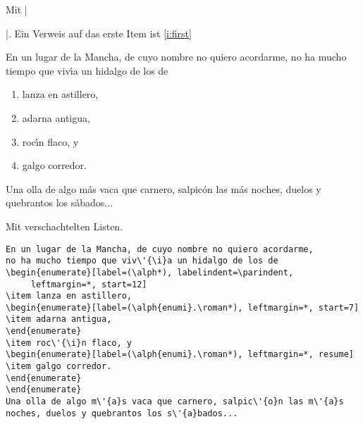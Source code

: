 \documentclass[a4paper,ngerman]{ltxguide}
\newcommand\0{\unskip\enspace\fbox{\fontsize{4}{4}\selectfont NEU 3.0}}
\newcommand\3{\unskip\enspace\fbox{\fontsize{4}{4}\selectfont NEW 3.0}}
\begin{document}
\begin{enumerate}[leftmargin=*]
\begin{enumerate}[leftmargin=\parindent]
\begin{enumerate}[labelindent=\parindent,|\allowbreak
| leftmargin=*,|\allowbreak| label=\Roman*.,|\allowbreak
| widest=IV,|\allowbreak| align=left]
\newsample

Mit |\begin{enumerate}[label=\fbox{\arabic*}]|. Ein Verweis auf das erste Item ist \ref{i:first}

\samplesep

En un lugar de la Mancha, de cuyo nombre no quiero acordarme,
no ha mucho tiempo que viv\'{\i}a un hidalgo de los de
\begin{enumerate}[label=\fbox{\arabic*}]
\item \label{i:first}lanza en astillero,
\item adarna antigua,
\item roc\'{\i}n flaco, y
\item galgo corredor.
\end{enumerate}
Una olla de algo m\'{a}s vaca que carnero, salpic\'{o}n las m\'{a}s
noches, duelos y quebrantos los s\'{a}bados...

\newsample

Mit verschachtelten Listen.

\samplesep

\begin{verbatim}
En un lugar de la Mancha, de cuyo nombre no quiero acordarme,
no ha mucho tiempo que viv\'{\i}a un hidalgo de los de
\begin{enumerate}[label=(\alph*), labelindent=\parindent,
     leftmargin=*, start=12]
\item lanza en astillero,
\begin{enumerate}[label=(\alph{enumi}.\roman*), leftmargin=*, start=7]
\item adarna antigua,
\end{enumerate}
\item roc\'{\i}n flaco, y
\begin{enumerate}[label=(\alph{enumi}.\roman*), leftmargin=*, resume]
\item galgo corredor.
\end{enumerate}
\end{enumerate}
Una olla de algo m\'{a}s vaca que carnero, salpic\'{o}n las m\'{a}s
noches, duelos y quebrantos los s\'{a}bados...
\end{verbatim}


\end{enumerate}
\end{enumerate}
\end{enumerate}
\end{enumerate}
\end{document}
